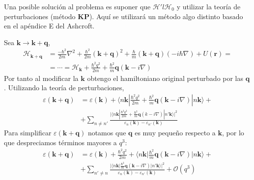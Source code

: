 Una posible solución al problema es suponer que $\mathcal{H}' l
\mathcal{H}_0$ y utilizar la teoría de perturbaciones (método
$\mathbf{K}\mathbf{P}$). Aquí se utilizará un método algo distinto
basado en el apéndice E del Ashcroft.

Sea $\mathbf{k}  \rightarrow \mathbf{k} + \mathbf{q} $,
\begin{equation}
  \begin{split}
    \mathcal{H}_{\mathbf{k}+\mathbf{q}} &= \frac{-\hbar^2}{2m}
    \nabla^2 + \frac{\hbar^2}{2m}(\mathbf{k}+\mathbf{q})^2 +
    \frac{\hbar}{m} (\mathbf{k}+\mathbf{q})(-i \hbar \nabla) +
    U(\mathbf{r}) = \\ &= \cdots = \mathcal{H}_\mathbf{k} +
    \frac{\hbar^2 q^2}{2m} + \frac{\hbar^2}{m} \mathbf{q}(\mathbf{k}-i\nabla)
  \end{split}
\end{equation}
Por tanto al modificar la $\mathbf{k}$ obtengo el hamiltoniano
original perturbado por las $\mathbf{q}$. Utilizando la teoría de
perturbaciones,
\begin{equation}
  \begin{split}
    \varepsilon (\mathbf{k}+\mathbf{q}) &= \varepsilon(\mathbf{k}) +
    \bigg \langle n \mathbf{k} \left| \frac{\hbar^2 q^2}{2m} +
      \frac{\hbar^2}{m} \mathbf{q}(\mathbf{k}- i \nabla) \right| n \mathbf{k}
    \bigg \rangle + \\
&+ \sum_{n\neq n'}\frac{
\bigg |\bigg \langle n \mathbf{k} |
      \frac{\hbar^2 q^2}{2m} + \frac{\hbar^2}{m}\mathbf{q}(k-i\nabla) | n'
      \mathbf{k} \bigg \rangle\bigg |^2
}{\varepsilon_n (\mathbf{k}) -
      \varepsilon_{n'}(\mathbf{k})}
  \end{split}
\end{equation}
Para simplificar $\varepsilon(\mathbf{k}+\mathbf{q})$ notamos que
$\mathbf{q}$ es muy pequeño respecto a $\mathbf{k}$, por lo que
despreciamos términos mayores a $q^3$:
\begin{equation}
  \begin{split}
    \varepsilon(\mathbf{k}+\mathbf{q}) &= \varepsilon(\mathbf{k}) +
    \frac{\hbar^2 q^2}{2m} + \bigg \langle n \mathbf{k} \bigg |
    \frac{\hbar^2}{m} \mathbf{q}(\mathbf{k}-i\nabla) \bigg | n \mathbf{k} \bigg
    \rangle +  \\
    &+ \sum_{n' \neq n} \frac{ \bigg| \bigg\langle n \mathbf{k}\bigg|
      \frac{\hbar^2}{m} \mathbf{q} (\mathbf{k} -i \nabla) \bigg| n'
      \mathbf{k} \bigg\rangle \bigg|^2 }{\varepsilon_n (\mathbf{k}) -
      \varepsilon_{n'}(\mathbf{k})} + \mathcal{O}(q^3)
  \end{split}
\end{equation}

